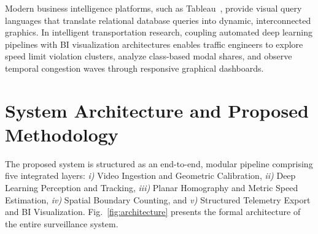 \documentclass[conference]{IEEEtran}
\begin{document}
Modern business intelligence platforms, such as Tableau~\cite{stolte2002polaris, heer2008prefuse}, provide visual query languages that translate relational database queries into dynamic, interconnected graphics. In intelligent transportation research, coupling automated deep learning pipelines with BI visualization architectures enables traffic engineers to explore speed limit violation clusters, analyze class-based modal shares, and observe temporal congestion waves through responsive graphical dashboards.

\section{System Architecture and Proposed Methodology}
The proposed system is structured as an end-to-end, modular pipeline comprising five integrated layers: \textit{i)} Video Ingestion and Geometric Calibration, \textit{ii)} Deep Learning Perception and Tracking, \textit{iii)} Planar Homography and Metric Speed Estimation, \textit{iv)} Spatial Boundary Counting, and \textit{v)} Structured Telemetry Export and BI Visualization. Fig.~\ref{fig:architecture} presents the formal architecture of the entire surveillance system.
\end{document}
